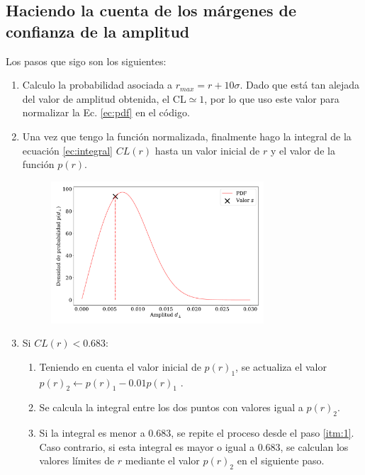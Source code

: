 \subsection{Haciendo la cuenta de los márgenes de confianza de la amplitud}

Los pasos que sigo son los siguientes: 

\begin{enumerate}
    \item Calculo la probabilidad asociada a $r_{max}=r +  10\sigma$. Dado que está tan alejada del valor de amplitud obtenida, el CL$\simeq 1$, por lo que uso este valor para normalizar  la Ec. \ref{ec:pdf} en el código.
    \item Una vez que tengo la función normalizada, finalmente hago la integral de la ecuación \ref{ec:integral} $CL(r)$ hasta un valor inicial de $r$ y el valor de la función $p(r)$.
    \begin{figure}[H]
        \begin{small}
            \begin{center}
                \includegraphics[width=0.75\textwidth]{bessel_prob_value_s.pdf}
            \end{center}
            \caption{}
        \end{small}
    \end{figure}
    \item Si $CL(r)< 0.683$:
    \begin{enumerate}
        \item Teniendo en cuenta el valor inicial de $p(r)_1$, se actualiza el valor  $p(r)_2 \leftarrow p(r)_1 - 0.01 p(r)_1$ \label{itm:1}.
        \item Se calcula la integral entre los dos puntos con valores igual a $p(r)_2$. 
        \item \label{itm:3} Si la integral es menor a $0.683$, se repite el proceso desde el paso \ref{itm:1}. Caso contrario, si esta integral es mayor o igual a $0.683$, se calculan los valores límites de $r$ mediante el valor $p(r)_2$ en el siguiente paso. 


\end{enumerate}
\end{enumerate}
